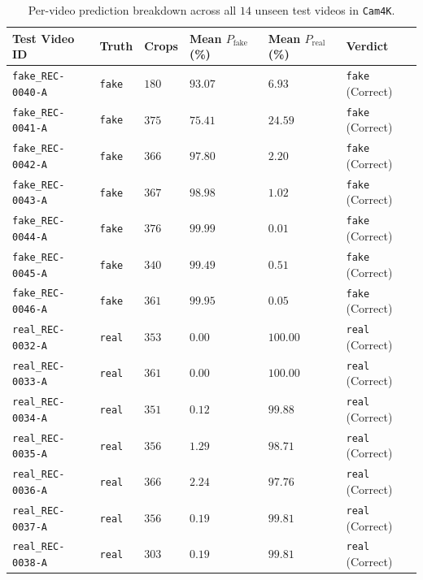 \begin{table}[htbp]
\centering
\caption{Per-video prediction breakdown across all $14$ unseen test videos in \texttt{Cam4K}.}
\label{tab:video_breakdown}
\small
\begin{tabular}{L{3.3cm}L{1.4cm}R{1.4cm}R{2.1cm}R{2.1cm}L{2.4cm}}
\toprule
\textbf{Test Video ID} & \textbf{Truth} & \textbf{Crops} & \textbf{Mean $P_{\text{fake}}$ (\%)} & \textbf{Mean $P_{\text{real}}$ (\%)} & \textbf{Verdict} \\
\midrule
\texttt{fake\_REC-0040-A} & \texttt{fake} & $180$ & $93.07$ & $6.93$ & \texttt{fake} (Correct) \\
\texttt{fake\_REC-0041-A} & \texttt{fake} & $375$ & $75.41$ & $24.59$ & \texttt{fake} (Correct) \\
\texttt{fake\_REC-0042-A} & \texttt{fake} & $366$ & $97.80$ & $2.20$ & \texttt{fake} (Correct) \\
\texttt{fake\_REC-0043-A} & \texttt{fake} & $367$ & $98.98$ & $1.02$ & \texttt{fake} (Correct) \\
\texttt{fake\_REC-0044-A} & \texttt{fake} & $376$ & $99.99$ & $0.01$ & \texttt{fake} (Correct) \\
\texttt{fake\_REC-0045-A} & \texttt{fake} & $340$ & $99.49$ & $0.51$ & \texttt{fake} (Correct) \\
\texttt{fake\_REC-0046-A} & \texttt{fake} & $361$ & $99.95$ & $0.05$ & \texttt{fake} (Correct) \\
\midrule
\texttt{real\_REC-0032-A} & \texttt{real} & $353$ & $0.00$ & $100.00$ & \texttt{real} (Correct) \\
\texttt{real\_REC-0033-A} & \texttt{real} & $361$ & $0.00$ & $100.00$ & \texttt{real} (Correct) \\
\texttt{real\_REC-0034-A} & \texttt{real} & $351$ & $0.12$ & $99.88$ & \texttt{real} (Correct) \\
\texttt{real\_REC-0035-A} & \texttt{real} & $356$ & $1.29$ & $98.71$ & \texttt{real} (Correct) \\
\texttt{real\_REC-0036-A} & \texttt{real} & $366$ & $2.24$ & $97.76$ & \texttt{real} (Correct) \\
\texttt{real\_REC-0037-A} & \texttt{real} & $356$ & $0.19$ & $99.81$ & \texttt{real} (Correct) \\
\texttt{real\_REC-0038-A} & \texttt{real} & $303$ & $0.19$ & $99.81$ & \texttt{real} (Correct) \\
\bottomrule
\end{tabular}
\end{table}

